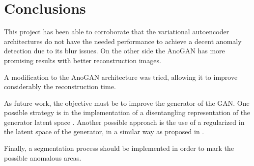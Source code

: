 \chapter{Conclusions}
\label{ch:conclusions}

This project has been able to corroborate that the variational autoencoder architectures do not have the needed performance to achieve a decent anomaly detection due to its blur issues. On the other side the AnoGAN has more promising results with better reconstruction images.

A modification to the AnoGAN architecture was tried, allowing it to improve considerably the reconstruction time.

As future work, the objective must be to improve the generator of the GAN. One possible strategy is in the implementation of a disentangling representation of the generator latent space \cite{Higgins2016}. Another possible approach is the use of a regularized in the latent space of the generator, in a similar way as proposed in \cite{Karras2018}.

Finally, a segmentation process should be implemented in order to mark the possible anomalous areas.
